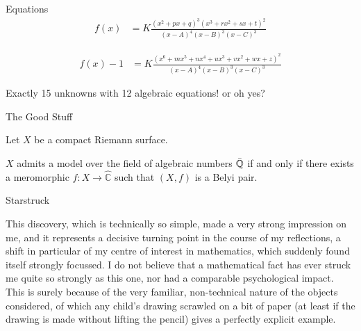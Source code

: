 \documentclass{beamer}
\newcommand{\QQ}{\mathbb{Q}}
\newcommand{\CC}{\mathbb{C}}
\begin{document}
\begin{frame}{Equations}
    \begin{align*}
        f(x) &= K\frac{(x^2 + px + q)^3(x^3 + rx^2 + sx + t)^2}{(x-A)^4(x-B)^3(x-C)^3}
    \end{align*}
    
    \begin{align*}
        f(x) - 1 &= K\frac{(x^6 + mx^5 + nx^4 + ux^3 + vx^2 + wx + z)^2}{(x-A)^4(x-B)^3(x-C)^3}
    \end{align*}
    
    Exactly 15 unknowns with 12 algebraic equations! or oh yes?
\end{frame}

\begin{frame}{The Good Stuff}
    \begin{theorem}
        Let $X$ be a compact Riemann surface. 
        
        $X$ admits a model over the field of algebraic numbers $\Bar{\QQ}$ if and only if there exists a meromorphic $f : X \to \hat{\CC}$ such that $(X,f)$ is a Belyi pair.
    \end{theorem}
\end{frame}

\begin{frame}{Starstruck}
\begin{exampleblock}{}
    This discovery, which is technically so simple, made a very strong impression on me, and it represents a {\color{blue} decisive turning point in the course of my reflections}, a shift in particular of my centre of interest in mathematics, which suddenly found itself strongly focussed. I do not believe that a {\color{blue} mathematical fact has ever struck me quite so strongly as this one, nor had a comparable psychological impact.} This is surely because of the very familiar, non-technical nature of the objects considered, of which any {\color{blue} child’s drawing} scrawled on a bit of paper (at least if the drawing is made without lifting the pencil) gives a perfectly explicit example.
  \vskip5mm
  \hspace*{}
\end{exampleblock}
\end{frame}
\end{document}
